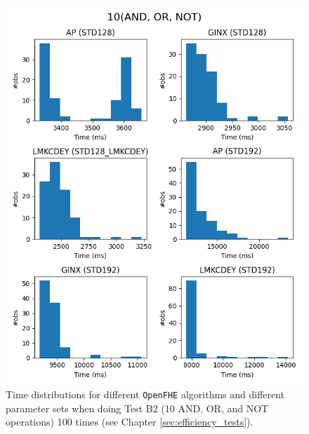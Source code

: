 \begin{figure}[ht]
    \centering
    \includegraphics[width=\textwidth]{data/figures/10AND_OR_NOT_distributions_1.png}
    \caption{Time distributions for different \texttt{OpenFHE} algorithms and different parameter sets when doing Test B2 (10 AND, OR, and NOT operations) 100 times (see Chapter \ref{sec:efficiency_tests}).}
    \label{fig:distr_10andornot1}
\end{figure}

